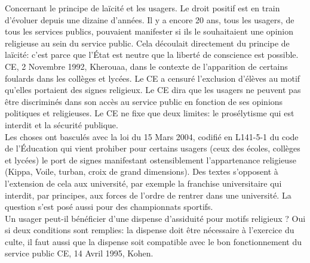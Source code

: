 \documentclass[10pt, a4paper, openany]{book}
\begin{document}
Concernant le principe de laïcité et les usagers. Le droit positif est en train d'évoluer depuis une dizaine d'années. Il y a encore 20 ans, tous les usagers, de tous les services publics, pouvaient manifester si ils le souhaitaient une opinion religieuse au sein du service public. Cela découlait directement du principe de laïcité: c'est parce que l'État est neutre que la liberté de conscience est possible. \\
CE, 2 Novembre 1992, Kherouaa, dans le contexte de l'apparition de certains foulards dans les collèges et lycées. Le CE a censuré l'exclusion d'élèves au motif qu'elles portaient des signes religieux. Le CE dira que les usagers ne peuvent pas être  discriminés dans son accès au service public en fonction de ses opinions politiques et religieuses. Le CE ne fixe que deux limites: le prosélytisme qui est interdit et la sécurité publique. \\
Les choses ont basculés avec la loi du 15 Mars 2004, codifié en L141-5-1 du code de l'Éducation qui vient prohiber pour certains usagers (ceux des écoles, collèges et lycées) le port de signes manifestant ostensiblement l'appartenance religieuse (Kippa, Voile, turban, croix de grand dimensions). Des textes s'opposent à l'extension de cela aux université, par exemple la franchise universitaire qui interdit, par principes, aux forces de l'ordre de rentrer dans une université. La question s'est posé aussi pour des championnats sportifs. \\
Un usager peut-il bénéficier d'une dispense d'assiduité pour motifs religieux ? Oui si deux conditions sont remplies: la dispense doit être nécessaire à l'exercice du culte, il faut aussi que la dispense soit compatible avec le bon fonctionnement du service public CE, 14 Avril 1995, Kohen. 
\end{document}
